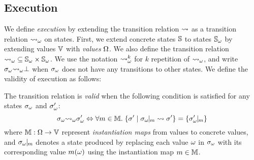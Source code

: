 \subsection{{\SealeD} Execution}

We define \textit{{\sealed} execution} by extending the transition
relation $\leadsto$ as a {\sealed} transition relation ${\leadsto}_\omega$ on {\sealed}
states.  First, we extend concrete states $\mathbb{S}$ to {\sealed} states
${\mathbb{S}}_\omega$ by extending values $\mathbb{V}$ with \textit{{\sealed} values}
$\Omega$.  We also define the {\sealed} transition relation ${\leadsto}_\omega
\subseteq {\mathbb{S}}_\omega \times {\mathbb{S}}_\omega$. We use the notation ${\leadsto}_\omega^k$
for $k$ repetition of ${\leadsto}_\omega$, and write ${\sigma}_\omega {\leadsto}_\omega \bot$ when
${\sigma}_\omega$ does not have any {\sealed} transitions to other {\sealed}
states.  We define the validity of {\sealed} execution as follows:
\begin{definition}[Validity]\label{def:valid-symbtrans}
  The {\sealed} transition relation is \textit{valid} when the following
  condition is satisfied for any {\sealed} states ${\sigma}_\omega$ and
  ${\sigma}_\omega'$:
  \[
    \symbst \symbtrans \symbst' \Leftrightarrow
    \forall \imap \in \imapset. \;
    \{ \st' \mid \instant{\symbst}{\imap} \trans \st' \}
    = \{ \instant{\symbst'}{\imap} \}
  \]
  where $\mathbb{M}: \Omega \rightarrow \mathbb{V}$ represent \textit{instantiation
  maps} from {\sealed} values to concrete values, and ${\sigma}_\omega\!\!\mid\!\!_{m}$
  denotes a state produced by replacing each {\sealed} value $\omega$ in
  ${\sigma}_\omega$ with its
  corresponding value $m(\omega)$ using the instantiation map $m \in
  \mathbb{M}$.
\end{definition}

